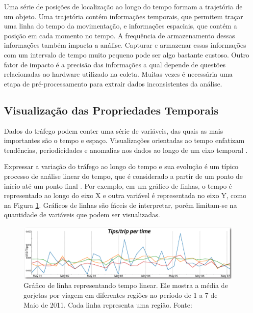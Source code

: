   Uma série de posições de localização ao longo do tempo formam a trajetória de
um objeto. Uma trajetória contém informações temporais, que permitem traçar uma
linha do tempo da movimentação, e informações espaciais, que contém a posição
em cada momento no tempo. A frequência de armazenamento dessas informações
também impacta a análise. Capturar e armazenar essas informações com um
intervalo de tempo muito pequeno pode ser algo bastante custoso. Outro fator de
impacto é a precisão das informações a qual depende de questões relacionadas ao
hardware utilizado na coleta. Muitas vezes é necessária uma etapa de
pré-processamento para extrair dados inconsistentes da análise.

\subsection {Visualização das Propriedades Temporais}
\label{sec:prop-temporais}

  Dados do tráfego podem conter uma série de variáveis, das quais as mais
importantes são o tempo e espaço. Visualizações orientadas ao tempo enfatizam
tendências, periodicidades e anomalias nos dados ao longo de um eixo temporal \citep{Aigner2008}.

  Expressar a variação do tráfego ao longo do tempo e sua evolução é um típico
processo de análise linear do tempo, que é considerado a partir de um ponto de
início até um ponto final \citep{Chen2015}. Por exemplo, em um gráfico de
linhas, o tempo é representado ao longo do eixo X e outra variável é
representada no eixo Y, como na Figura \ref{fig:linear-time}. Gráficos de
linhas são fáceis de interpretar, porém limitam-se na quantidade de variáveis
que podem ser visualizadas.

\begin{figure}[!htb]
  \centering
  \includegraphics[width=\textwidth]{../figuras/linear-time.png}
  \caption[Gráfico de linha representando empo linear]{Gráfico de linha representando tempo linear. Ele mostra a média de gorjetas por viagem em diferentes regiões no período de 1 a 7 de Maio de 2011. Cada linha representa uma região. Fonte: \citep{Ferreira2013}
  \label{fig:linear-time}}
\end{figure}

